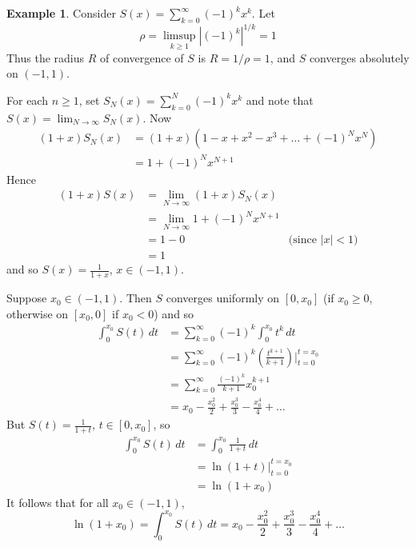 \documentclass[11pt]{article}
\theoremstyle{definition}
\newtheorem{exmp}[thm]{Example}
\begin{document}
\begin{exmp}
Consider $S(x) = \sum_{k=0}^\infty (-1)^k x^k$. Let
$$\rho = \limsup_{k\geq1} |(-1)^k|^{1/k} = 1$$
Thus the radius $R$ of convergence of $S$ is $R = 1/\rho = 1$, and $S$ converges absolutely on $(-1, 1)$. 

For each $n \geq 1$, set $S_N(x) = \sum_{k=0}^N (-1)^k x^k$ and note that $S(x) = \lim_{N\to\infty} S_N(x)$. Now
\begin{align*}
(1+x)S_N(x) & = (1+x)(1 - x + x^2 - x^3 + \dots + (-1)^N x^N) \\
& = 1 + (-1)^N x^{N+1}
\end{align*}
Hence
\begin{align*}
(1+x)S(x) & = \lim_{N\to\infty} (1+x)S_N(x) \\
& = \lim_{N\to\infty} 1 + (-1)^N x^{N+1} \\
& = 1 - 0 & \text{(since $|x| < 1$)} \\
& = 1
\end{align*}
and so $S(x) = \frac{1}{1+x}$, $x \in (-1, 1)$.

Suppose $x_0 \in (-1, 1)$. Then $S$ converges uniformly on $[0, x_0]$ (if $x_0 \geq 0$, otherwise on $[x_0, 0]$ if $x_0 < 0$) and so
\begin{align*}
\int_0^{x_0} S(t)\,dt & = \sum_{k=0}^\infty (-1)^k \int_0^{x_0} t^k\,dt \\
& = \sum_{k=0}^\infty (-1)^k \left( \frac{t^{k+1}}{k+1} \right) \biggr|_{t=0}^{t=x_0} \\
& = \sum_{k=0}^\infty \frac{(-1)^k}{k+1} x_0^{k+1} \\
& = x_0 - \frac{x_0^2}2 + \frac{x_0^3}3 - \frac{x_0^4}4 + \dots
\end{align*}
But $S(t) = \frac{1}{1+t}$, $t \in [0, x_0]$, so
\begin{align*}
\int_0^{x_0} S(t)\,dt & = \int_0^{x_0} \frac{1}{1+t}\,dt \\
& = \ln(1+t) \biggr|_{t=0}^{t=x_0} \\
& = \ln(1 + x_0)
\end{align*}
It follows that for all $x_0 \in (-1, 1)$,
$$\ln(1+x_0) = \int_0^{x_0} S(t)\,dt = x_0 - \frac{x_0^2}2 + \frac{x_0^3}3 - \frac{x_0^4}4 + \dots$$
\end{exmp}
\end{document}
